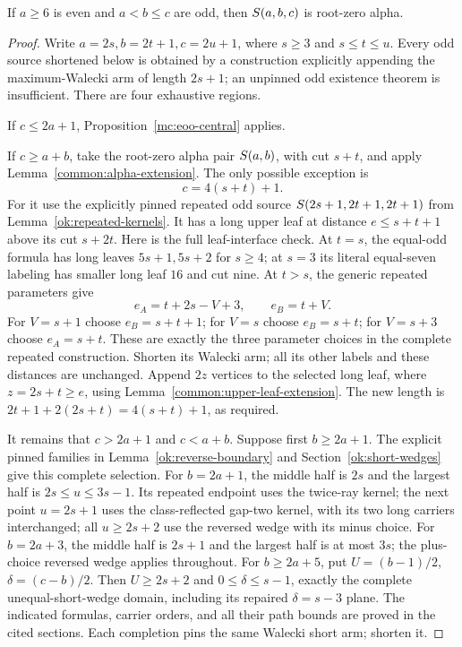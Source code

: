 \begin{theorem}\label{mc:all-eoo-large}
If $a\ge6$ is even and $a<b\le c$ are odd, then
$S\!\left(a,b,c\right)$ is root-zero alpha.
\end{theorem}
\begin{proof}
Write $a=2s,b=2t+1,c=2u+1$, where $s\ge3$ and
$s\le t\le u$.  Every odd source shortened below is obtained
by a construction explicitly appending the maximum-Walecki arm of
length $2s+1$; an unpinned odd existence theorem is insufficient.
There are four exhaustive regions.

If $c\le2a+1$, Proposition~\ref{mc:eoo-central} applies.

If $c\ge a+b$, take the root-zero alpha pair $S\!\left(a,b\right)$,
with cut $s+t$, and apply Lemma~\ref{common:alpha-extension}.
The only possible exception is
\begin{equation}\label{mc:eoo-far-resonance}
 c=4(s+t)+1.
\end{equation}
For it use the explicitly pinned repeated odd source
$S\!\left(2s+1,2t+1,2t+1\right)$ from
Lemma~\ref{ok:repeated-kernels}.  It has a long upper leaf at
distance $e\le s+t+1$ above its cut $s+2t$.
Here is the full leaf-interface check.  At $t=s$, the equal-odd
formula has long leaves $5s+1,5s+2$ for $s\ge4$; at $s=3$
its literal equal-seven labeling has smaller long leaf $16$ and
cut nine.  At $t>s$, the generic repeated parameters give
\[
 e_A=t+2s-V+3,\qquad e_B=t+V.
\]
For $V=s+1$ choose $e_B=s+t+1$; for $V=s$ choose $e_B=s+t$;
for $V=s+3$ choose $e_A=s+t$.  These are exactly the three
parameter choices in the complete repeated construction.
Shorten its Walecki arm; all its other labels and these distances
are unchanged.  Append $2z$ vertices to the selected long leaf,
where $z=2s+t\ge e$, using
Lemma~\ref{common:upper-leaf-extension}.  The new length is
$2t+1+2(2s+t)=4(s+t)+1$, as required.

It remains that $c>2a+1$ and $c<a+b$.
Suppose first $b\ge2a+1$.  The explicit pinned families in
Lemma~\ref{ok:reverse-boundary} and Section~\ref{ok:short-wedges}
give this complete selection.  For $b=2a+1$, the middle half
is $2s$ and the largest half is $2s\le u\le3s-1$.
Its repeated endpoint uses the twice-ray kernel; the next point
$u=2s+1$ uses the class-reflected gap-two kernel, with its two
long carriers interchanged;
all $u\ge2s+2$ use the reversed wedge with its minus choice.
For $b=2a+3$, the middle half is $2s+1$ and the largest half
is at most $3s$; the plus-choice reversed wedge applies throughout.
For $b\ge2a+5$, put $U=(b-1)/2$, $\delta=(c-b)/2$.
Then $U\ge2s+2$ and $0\le\delta\le s-1$, exactly the
complete unequal-short-wedge domain, including its repaired
$\delta=s-3$ plane.  The indicated formulas, carrier orders,
and all their path bounds are proved in the cited sections.
Each completion pins the same Walecki short arm; shorten it.


\end{proof}
